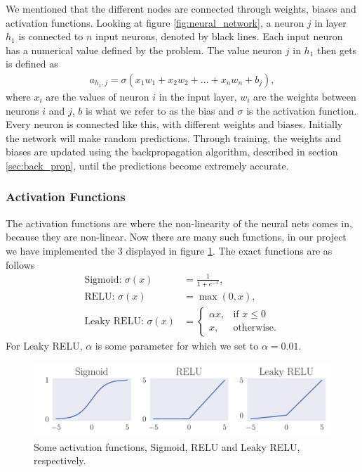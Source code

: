 \documentclass[12pt]{extarticle}
\begin{document}
We mentioned that the different nodes are connected through weights, biases and activation functions. Looking at figure \ref{fig:neural_network}, a neuron $j$ in layer $h_1$ is connected to $n$ input neurons, denoted by black lines. Each input neuron has a numerical value defined by the problem. The value neuron $j$ in $h_1$ then gets is defined as
\begin{align}
	a_{h_1, j} = \sigma (x_1w_1 + x_2w_2 + \dots + x_nw_n + b_j),
\end{align}
where $x_i$ are the values of neuron $i$ in the input layer, $w_i$ are the weights between neurons $i$ and $j$, $b$ is what we refer to as the bias and $\sigma$ is the activation function. Every neuron is connected like this, with different weights and biases. Initially the network will make random predictions. Through training, the weights and biases are updated using the backpropagation algorithm, described in section \ref{sec:back_prop}, until the predictions become extremely accurate.

\subsubsection{Activation Functions}
The activation functions are where the non-linearity of the neural nets comes in, because they are non-linear. Now there are many such functions, in our project we have implemented the 3 displayed in figure \ref{fig:activation_functions}. The exact functions are as follows
\begin{align}
	\text{Sigmoid: }\sigma(x)    & = \frac{1}{1 + e^{-x}},\label{eq:sigmoid}          \\
	\text{RELU: }\sigma(x)       & = \max(0,x), \label{eq:RELU}                       \\
	\text{Leaky RELU: }\sigma(x) & = \begin{cases}
		\alpha x, & \text{if } x\leq 0 \\
		x,        & \text{otherwise}.
	\end{cases} \label{eq:leaky_RELU}
\end{align}
For Leaky RELU, $\alpha$ is some parameter for which we set to $\alpha = 0.01$.

\begin{figure}[h]
	\includegraphics[width=\linewidth]{pictures/activation_functions.pdf}
	\caption{Some activation functions, Sigmoid, RELU and Leaky RELU, respectively.}\label{fig:activation_functions}
\end{figure}
\end{document}
